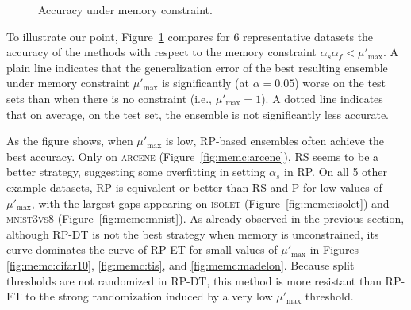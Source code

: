 \begin{figure}
\begin{center}
\caption{Accuracy under memory constraint.}
\label{fig:9:memc}
\end{center}
\end{figure}

To illustrate our point, Figure~\ref{fig:9:memc} compares for 6 representative
datasets the accuracy of the methods with respect to the memory constraint $\alpha_s
\alpha_f < \mu'_{\text{max}}$.  A plain line indicates that the generalization error of the
best resulting ensemble under memory constraint $\mu'_{\text{max}}$ is significantly (at $\alpha=0.05$)
worse on the test sets than when there is no constraint
(i.e., $\mu'_{\text{max}}=1$). A dotted line indicates that on average, on the test set, the
ensemble is not significantly less accurate.

As the figure shows, when $\mu'_{\text{max}}$ is low, RP-based ensembles often achieve
the best accuracy. Only on \textsc{arcene} (Figure~\ref{fig:memc:arcene}), RS seems to be a
better strategy, suggesting some overfitting in setting $\alpha_s$ in RP. On all 5
other example datasets, RP is equivalent or better than RS and P for low values
of $\mu'_{\text{max}}$, with the largest gaps appearing on \textsc{isolet}
(Figure~\ref{fig:memc:isolet}) and \textsc{mnist3vs8} (Figure~\ref{fig:memc:mnist}). As
already observed in the previous section, although RP-DT is not the best
strategy when memory is unconstrained, its curve dominates the curve of RP-ET
for small values of $\mu'_{\text{max}}$ in Figures \ref{fig:memc:cifar10},
\ref{fig:memc:tis}, and \ref{fig:memc:madelon}. Because split thresholds are
not randomized in RP-DT, this method is more resistant than RP-ET to the strong
randomization induced by a very low $\mu'_{\text{max}}$ threshold.

